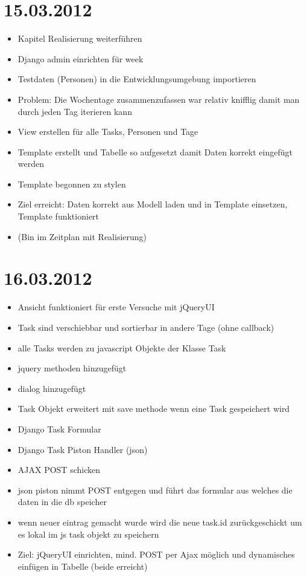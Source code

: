 \section{15.03.2012}
\begin{itemize}
    \item Kapitel Realisierung weiterführen
    \item Django admin einrichten für week
    \item Testdaten (Personen) in die Entwicklungsumgebung importieren
    \item Problem: Die Wochentage zusammenzufassen war relativ knifflig damit man durch jeden Tag iterieren kann
    \item View erstellen für alle Tasks, Personen und Tage
    \item Template erstellt und Tabelle so aufgesetzt damit Daten korrekt eingefügt werden
    \item Template begonnen zu stylen
    \item Ziel erreicht: Daten korrekt aus Modell laden und in Template einsetzen, Template funktioniert
    \item (Bin im Zeitplan mit Realisierung)
\end{itemize}
\section{16.03.2012}
    \begin{itemize}
        \item Ansicht funktioniert für erste Versuche mit jQueryUI
        \item Task sind verschiebbar und sortierbar in andere Tage (ohne callback)
        \item alle Tasks werden zu javascript Objekte der Klasse Task
        \item jquery methoden hinzugefügt
        \item dialog hinzugefügt
        \item Task Objekt erweitert mit save methode wenn eine Task gespeichert wird
        \item Django Task Formular
        \item Django Task Piston Handler (json)
        \item AJAX POST schicken
        \item json piston nimmt POST entgegen und führt das formular aus welches die daten in die db speicher
        \item wenn neuer eintrag gemacht wurde wird die neue task.id zurückgeschickt um es lokal im js task objekt zu speichern
        \item Ziel: jQueryUI einrichten, mind. POST per Ajax möglich und dynamisches einfügen in Tabelle (beide erreicht)
    \end{itemize}